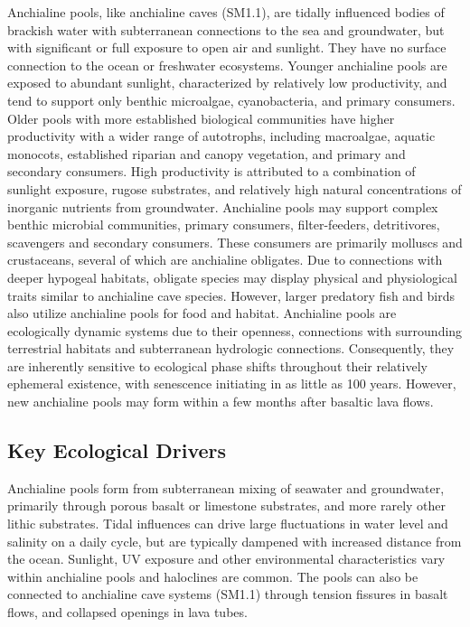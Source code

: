 \documentclass[
  letterpaper,
  DIV=11,
  numbers=noendperiod]{scrartcl}
\begin{document}
Anchialine pools, like anchialine caves (SM1.1), are tidally influenced
bodies of brackish water with subterranean connections to the sea and
groundwater, but with significant or full exposure to open air and
sunlight. They have no surface connection to the ocean or freshwater
ecosystems. Younger anchialine pools are exposed to abundant sunlight,
characterized by relatively low productivity, and tend to support only
benthic microalgae, cyanobacteria, and primary consumers. Older pools
with more established biological communities have higher productivity
with a wider range of autotrophs, including macroalgae, aquatic
monocots, established riparian and canopy vegetation, and primary and
secondary consumers. High productivity is attributed to a combination of
sunlight exposure, rugose substrates, and relatively high natural
concentrations of inorganic nutrients from groundwater. Anchialine pools
may support complex benthic microbial communities, primary consumers,
filter-feeders, detritivores, scavengers and secondary consumers. These
consumers are primarily molluscs and crustaceans, several of which are
anchialine obligates. Due to connections with deeper hypogeal habitats,
obligate species may display physical and physiological traits similar
to anchialine cave species. However, larger predatory fish and birds
also utilize anchialine pools for food and habitat. Anchialine pools are
ecologically dynamic systems due to their openness, connections with
surrounding terrestrial habitats and subterranean hydrologic
connections. Consequently, they are inherently sensitive to ecological
phase shifts throughout their relatively ephemeral existence, with
senescence initiating in as little as 100 years. However, new anchialine
pools may form within a few months after basaltic lava flows.

\subsection{Key Ecological Drivers}\label{key-ecological-drivers-67}

Anchialine pools form from subterranean mixing of seawater and
groundwater, primarily through porous basalt or limestone substrates,
and more rarely other lithic substrates. Tidal influences can drive
large fluctuations in water level and salinity on a daily cycle, but are
typically dampened with increased distance from the ocean. Sunlight, UV
exposure and other environmental characteristics vary within anchialine
pools and haloclines are common. The pools can also be connected to
anchialine cave systems (SM1.1) through tension fissures in basalt
flows, and collapsed openings in lava tubes.
\end{document}
